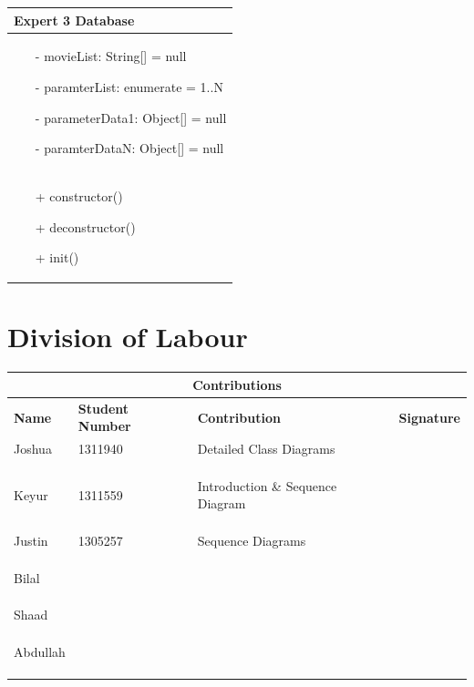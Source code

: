 \documentclass[]{article}
\begin{document}
\begin{table}[H]
\centering
\begin{tabular}{|>{\centering\arraybackslash}p{10cm}|}
\hline
Expert 3 Database\\
\hline
\begin{itemize}
\item[-] movieList: String[] = null
\item[-] paramterList: enumerate = 1..N
\item[-] parameterData1: Object[] = null
\item[-] paramterDataN: Object[] = null
\end{itemize}
\\
\hline
\begin{itemize}
\item[+] constructor()
\item[+] deconstructor()
\item[+] init()
\end{itemize}
\\
\hline
\end{tabular}
\end{table}

\newpage
\clearpage
\appendix
\section{Division of Labour}
\label{sec:division_of_labour}
\begin{tabular}{ |p{3cm}||p{2cm}|p{6cm}|p{1.5cm}|  }
 \hline
 \multicolumn{4}{|c|}{Contributions} \\
 \hline
 \textbf{Name}& \textbf{Student Number}& \textbf{Contribution}& \textbf{Signature}\\
 \hline
 Joshua & 1311940 & Detailed Class Diagrams &   \\ 
 &&&   \\
 &&&   \\
 &&&   \\
 \hline
 Keyur  & 1311559   & Introduction \& Sequence Diagram  &\\
 &&&   \\
 &&&   \\
 &&&   \\
 \hline
 Justin & 1305257 & Sequence Diagrams & \\
 &&&   \\
 &&&   \\
 &&&   \\
 \hline
 Bilal & & & \\
 &&&   \\
 &&&   \\
 &&&   \\
 \hline
 Shaad &  & &\\
 &&&   \\
 &&&   \\
 &&&   \\
 \hline
 Abdullah & &  &\\
 &&&   \\
 &&&   \\
 &&&   \\
 \hline
\end{tabular}
\end{document}
